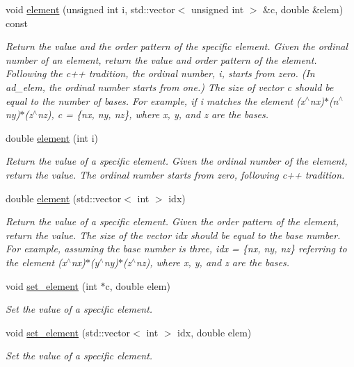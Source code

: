 \begin{DoxyCompactItemize}
void \mbox{\hyperlink{struct_d_a_vector_a3c5a753fb040155746a04f5cd01b0c8b}{element}} (unsigned int i, std\+::vector$<$ unsigned int $>$ \&c, double \&elem) const
\begin{DoxyCompactList}\small\item\em Return the value and the order pattern of the specific element. Given the ordinal number of an element, return the value and order pattern of the element. Following the c++ tradition, the ordinal number, i, starts from zero. (In ad\+\_\+elem, the ordinal number starts from one.) The size of vector c should be equal to the number of bases. For example, if i matches the element (x$^\wedge$nx)$\ast$(n$^\wedge$ny)$\ast$(z$^\wedge$nz), c = \{nx, ny, nz\}, where x, y, and z are the bases. \end{DoxyCompactList}\item 
double \mbox{\hyperlink{struct_d_a_vector_aa2cabf406529dff2d2a27c340f60826e}{element}} (int i)
\begin{DoxyCompactList}\small\item\em Return the value of a specific element. Given the ordinal number of the element, return the value. The ordinal number starts from zero, following c++ tradition. \end{DoxyCompactList}\item 
double \mbox{\hyperlink{struct_d_a_vector_a53070a432d184992aaaa69e1cb9f609d}{element}} (std\+::vector$<$ int $>$ idx)
\begin{DoxyCompactList}\small\item\em Return the value of a specific element. Given the order pattern of the element, return the value. The size of the vector idx should be equal to the base number. For example, assuming the base number is three, idx = \{nx, ny, nz\} referring to the element (x$^\wedge$nx)$\ast$(y$^\wedge$ny)$\ast$(z$^\wedge$nz), where x, y, and z are the bases. \end{DoxyCompactList}\item 
void \mbox{\hyperlink{struct_d_a_vector_a08078f536d095d8c7423ea2989a7854c}{set\+\_\+element}} (int $\ast$c, double elem)
\begin{DoxyCompactList}\small\item\em Set the value of a specific element. \end{DoxyCompactList}\item 
void \mbox{\hyperlink{struct_d_a_vector_a4403b07be6cfbac43bfa05fef187caab}{set\+\_\+element}} (std\+::vector$<$ int $>$ idx, double elem)
\begin{DoxyCompactList}\small\item\em Set the value of a specific element. \end{DoxyCompactList}\item 

\end{DoxyCompactItemize}
